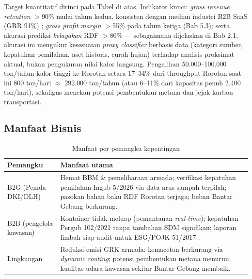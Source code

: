 Target kuantitatif dirinci pada Tabel di atas. Indikator kunci: \textit{gross revenue retention} $>$90\% mulai tahun kedua, konsisten dengan median industri B2B SaaS (GRR 91\%) \parencite{saascapital2023}; \textit{gross profit margin} $>$55\% pada tahun ketiga (Bab 5.3); serta akurasi prediksi \textit{kelayakan} RDF $>$80\% --- sebagaimana dijelaskan di Bab 2.1, akurasi ini mengukur kesesuaian \textit{proxy classifier} berbasis data (kategori sumber, kepatuhan pemilahan, aset historis, curah hujan) terhadap analisis proksimat aktual, bukan pengukuran nilai kalor langsung. Pengalihan 50.000--100.000 ton/tahun kalor-tinggi ke Rorotan setara 17--34\% dari throughput Rorotan saat ini \textpm{}800 ton/hari $\approx$ 292.000 ton/tahun \parencite{rorotan2026} (atau 6--11\% dari kapasitas penuh 2.400 ton/hari), sekaligus menekan potensi pembentukan metana dan jejak karbon transportasi.

\subsection{Manfaat Bisnis}
\label{sec:1-3}

\begin{table}[H]
\footnotesize
\renewcommand{\arraystretch}{0.85}
\begin{tabularx}{\textwidth}{|>{\RaggedRight\arraybackslash}p{3.6cm}|>{\RaggedRight\arraybackslash}X|}
\hline
\textbf{Pemangku} & \textbf{Manfaat utama} \\
\hline
B2G (Pemda DKI/DLH) & Hemat BBM \& pemeliharaan armada; verifikasi kepatuhan pemilahan Ingub 5/2026 via data arus sampah terpilah; pasokan bahan baku RDF Rorotan terjaga; beban Bantar Gebang berkurang. \\
\hline
B2B (pengelola kawasan) & Kontainer tidak meluap (pemantauan \textit{real-time}); kepatuhan Pergub 102/2021 tanpa tambahan SDM signifikan; laporan limbah siap audit untuk ESG/POJK 51/2017 \parencite{pergub102,pojk51}. \\
\hline
Lingkungan & Reduksi emisi GRK armada; kemacetan berkurang via \textit{dynamic routing}; potensi pembentukan metana menurun; kualitas udara kawasan sekitar Bantar Gebang membaik. \\
\hline
\end{tabularx}
\caption{Manfaat \ProductName{} per pemangku kepentingan}
\end{table}